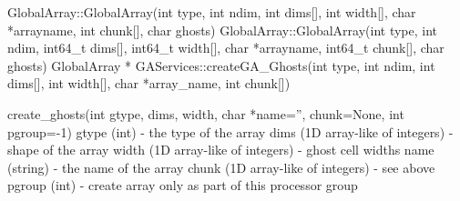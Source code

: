 \documentclass[12pt]{article}
\begin{document}
\begin{cxxapi}
\begin{cxxcode}
GlobalArray::GlobalArray(int type, int ndim, int dims[], int width[],
                         char *arrayname, int chunk[], char ghosts)
GlobalArray::GlobalArray(int type, int ndim, int64_t dims[], int64_t width[],
                         char *arrayname, int64_t chunk[], char ghosts)
GlobalArray * GAServices::createGA_Ghosts(int type, int ndim, int dims[],
                                          int width[], char *array_name, 
                                          int chunk[])
\end{cxxcode}
\begin{funcargs}
\end{funcargs}
\end{cxxapi}

\begin{pyapi}
\begin{pycode}
create_ghosts(int gtype, dims, width, char *name='', chunk=None, int pgroup=-1)
   gtype (int)                       - the type of the array
   dims (1D array-like of integers)  - shape of the array
   width (1D array-like of integers) - ghost cell widths
   name (string)                     - the name of the array
   chunk (1D array-like of integers) - see above
   pgroup (int)                      - create array only as part of this 
                                       processor group
\end{pycode}
\end{pyapi}

\dcoll
\end{document}
